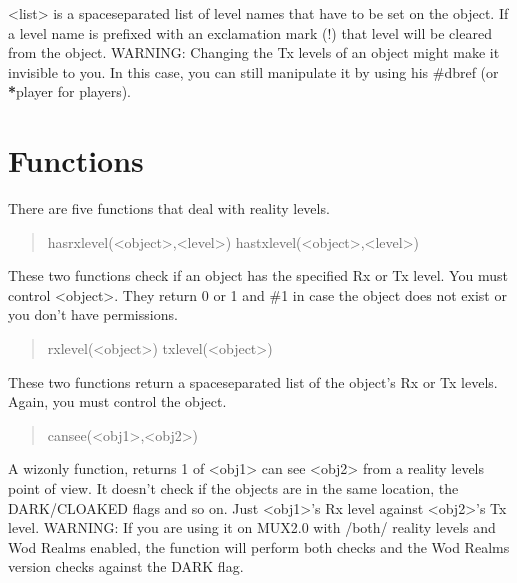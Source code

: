 \documentclass[letterpaper,10pt,english]{sphinxmanual}
\begin{document}
\sphinxAtStartPar
\textless{}list\textgreater{} is a space\sphinxhyphen{}separated list of level names that have to be set on the
object. If a level name is prefixed with an exclamation mark (!) that level
will be cleared from the object.
WARNING: Changing the Tx levels of an object might make it invisible to you.
In this case, you can still manipulate it by using his \#dbref (or {\color{red}\bfseries{}*}player
for players).


\section{Functions}
\label{\detokenize{19-reality:functions}}
\sphinxAtStartPar
There are five functions that deal with reality levels.
\begin{quote}

\sphinxAtStartPar
hasrxlevel(\textless{}object\textgreater{},\textless{}level\textgreater{})
hastxlevel(\textless{}object\textgreater{},\textless{}level\textgreater{})
\end{quote}

\sphinxAtStartPar
These two functions check if an object has the specified Rx or Tx level.
You must control \textless{}object\textgreater{}. They return 0 or 1 and \#\sphinxhyphen{}1 in case the object
does not exist or you don’t have permissions.
\begin{quote}

\sphinxAtStartPar
rxlevel(\textless{}object\textgreater{})
txlevel(\textless{}object\textgreater{})
\end{quote}

\sphinxAtStartPar
These two functions return a space\sphinxhyphen{}separated list of the object’s Rx or Tx
levels. Again, you must control the object.
\begin{quote}

\sphinxAtStartPar
cansee(\textless{}obj1\textgreater{},\textless{}obj2\textgreater{})
\end{quote}

\sphinxAtStartPar
A wiz\sphinxhyphen{}only function, returns 1 of \textless{}obj1\textgreater{} can see \textless{}obj2\textgreater{} from a reality
levels point of view. It doesn’t check if the objects are in the same
location, the DARK/CLOAKED flags and so on. Just \textless{}obj1\textgreater{}’s Rx level against
\textless{}obj2\textgreater{}’s Tx level.
WARNING: If you are using it on MUX2.0 with /both/ reality levels and Wod
Realms enabled, the function will perform both checks and the Wod Realms
version checks against the DARK flag.
\end{document}
